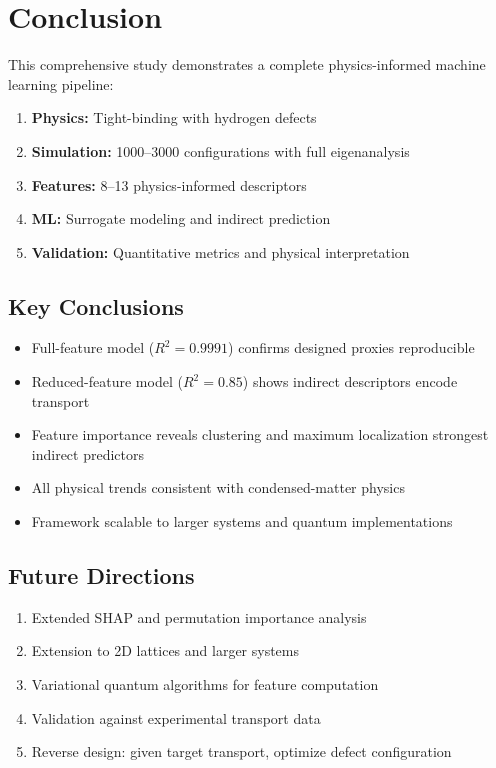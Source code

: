 \documentclass[11pt,a4paper]{article}
\begin{document}
\section{Conclusion}

This comprehensive study demonstrates a complete physics-informed machine learning pipeline:

\begin{enumerate}
    \item \textbf{Physics:} Tight-binding with hydrogen defects
    \item \textbf{Simulation:} 1000--3000 configurations with full eigenanalysis
    \item \textbf{Features:} 8--13 physics-informed descriptors
    \item \textbf{ML:} Surrogate modeling and indirect prediction
    \item \textbf{Validation:} Quantitative metrics and physical interpretation
\end{enumerate}

\subsection{Key Conclusions}

\begin{itemize}
    \item Full-feature model ($R^2 = 0.9991$) confirms designed proxies reproducible
    \item Reduced-feature model ($R^2 = 0.85$) shows indirect descriptors encode transport
    \item Feature importance reveals clustering and maximum localization strongest indirect predictors
    \item All physical trends consistent with condensed-matter physics
    \item Framework scalable to larger systems and quantum implementations
\end{itemize}

\subsection{Future Directions}

\begin{enumerate}
    \item Extended SHAP and permutation importance analysis
    \item Extension to 2D lattices and larger systems
    \item Variational quantum algorithms for feature computation
    \item Validation against experimental transport data
    \item Reverse design: given target transport, optimize defect configuration
\end{enumerate}
\end{document}
